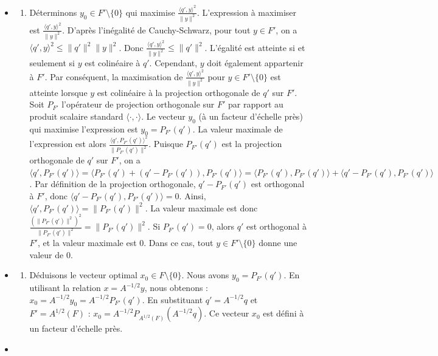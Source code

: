 \documentclass[11pt,a4paper]{report}
\begin{document}
\begin{enumerate}
  \begin{itemize}
  \item
    \begin{enumerate}
    \def\labelenumii{\alph{enumii})}

    \item
      Déterminons \(y_0 \in F' \setminus \{0\}\) qui maximise
      \(\frac{\langle q', y \rangle^2}{\|y\|^2}\). L'expression à
      maximiser est \(\frac{\langle q', y \rangle^2}{\|y\|^2}\). D'après
      l'inégalité de Cauchy-Schwarz, pour tout \(y \in F'\), on a
      \(\langle q', y \rangle^2 \le \|q'\|^2 \|y\|^2\). Donc
      \(\frac{\langle q', y \rangle^2}{\|y\|^2} \le \|q'\|^2\).
      L'égalité est atteinte si et seulement si \(y\) est colinéaire à
      \(q'\). Cependant, \(y\) doit également appartenir à \(F'\). Par
      conséquent, la maximisation de
      \(\frac{\langle q', y \rangle^2}{\|y\|^2}\) pour
      \(y \in F' \setminus \{0\}\) est atteinte lorsque \(y\) est
      colinéaire à la projection orthogonale de \(q'\) sur \(F'\). Soit
      \(P_{F'}\) l'opérateur de projection orthogonale sur \(F'\) par
      rapport au produit scalaire standard
      \(\langle \cdot, \cdot \rangle\). Le vecteur \(y_0\) (à un facteur
      d'échelle près) qui maximise l'expression est
      \(y_0 = P_{F'}(q')\). La valeur maximale de l'expression est alors
      \(\frac{\langle q', P_{F'}(q') \rangle^2}{\|P_{F'}(q')\|^2}\).
      Puisque \(P_{F'}(q')\) est la projection orthogonale de \(q'\) sur
      \(F'\), on a
      \(\langle q', P_{F'}(q') \rangle = \langle P_{F'}(q') + (q' - P_{F'}(q')), P_{F'}(q') \rangle = \langle P_{F'}(q'), P_{F'}(q') \rangle + \langle q' - P_{F'}(q'), P_{F'}(q') \rangle\).
      Par définition de la projection orthogonale, \(q' - P_{F'}(q')\)
      est orthogonal à \(F'\), donc
      \(\langle q' - P_{F'}(q'), P_{F'}(q') \rangle = 0\). Ainsi,
      \(\langle q', P_{F'}(q') \rangle = \|P_{F'}(q')\|^2\). La valeur
      maximale est donc
      \(\frac{(\|P_{F'}(q')\|^2)^2}{\|P_{F'}(q')\|^2} = \|P_{F'}(q')\|^2\).
      Si \(P_{F'}(q') = 0\), alors \(q'\) est orthogonal à \(F'\), et la
      valeur maximale est 0. Dans ce cas, tout
      \(y \in F' \setminus \{0\}\) donne une valeur de 0.
    \end{enumerate}
  \item
    \begin{enumerate}
    \def\labelenumii{\alph{enumii})}
    \setcounter{enumii}{1}

    \item
      Déduisons le vecteur optimal \(x_0 \in F \setminus \{0\}\). Nous
      avons \(y_0 = P_{F'}(q')\). En utilisant la relation
      \(x = A^{-1/2}y\), nous obtenons :
      \(x_0 = A^{-1/2}y_0 = A^{-1/2}P_{F'}(q')\). En substituant
      \(q' = A^{-1/2}q\) et \(F' = A^{1/2}(F)\) :
      \(x_0 = A^{-1/2}P_{A^{1/2}(F)}(A^{-1/2}q)\). Ce vecteur \(x_0\)
      est défini à un facteur d'échelle près.
    \end{enumerate}
  \item
    \begin{enumerate}
    \def\labelenumii{\alph{enumii})}
    \setcounter{enumii}{2}


\end{enumerate}
\end{itemize}
\end{enumerate}
\end{document}
